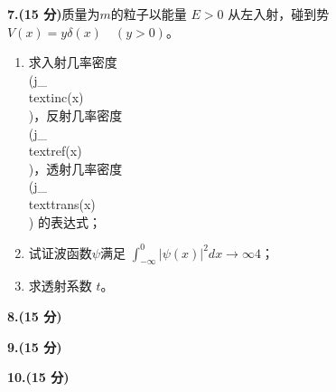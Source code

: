 \textbf{7.(15 分)}质量为$m$的粒子以能量 $E > 0$ 从左入射，碰到势 $V(x) = y\delta(x) \quad (y > 0)$。

\begin{enumerate}
    \item 求入射几率密度 \\(j_{\\text{inc}}(x)\\)，反射几率密度 \\(j_{\\text{ref}}(x)\\)，透射几率密度 \\(j_{\\text{trans}}(x)\\) 的表达式；
    \item 试证波函数$\psi$满足 $\int_{-\infty}^{0} \left| \psi(x) \right|^2 dx \to \infty4$；
    \item 求透射系数 $t$。
\end{enumerate}

\textbf{8.(15 分)}

\textbf{9.(15 分)}

\textbf{10.(15 分)}